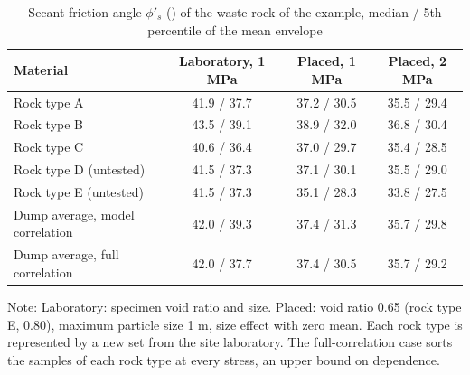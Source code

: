 \documentclass[Journal,letterpaper,InsideFigs,NoLists,NoLineNumbers]{ascelike-new}
\begin{document}
\begin{table}[htbp]
\caption{Secant friction angle $\phi'_s$ (\textdegree{}) of the waste rock of the example, median / 5th percentile of the mean envelope}
\centering\small
\renewcommand{\arraystretch}{1.2}
\setlength{\tabcolsep}{3.5pt}
\begin{tabular}{lccc}
\hline
Material & Laboratory, 1 MPa & Placed, 1 MPa & Placed, 2 MPa \\
\hline
Rock type A & 41.9 / 37.7 & 37.2 / 30.5 & 35.5 / 29.4 \\
Rock type B & 43.5 / 39.1 & 38.9 / 32.0 & 36.8 / 30.4 \\
Rock type C & 40.6 / 36.4 & 37.0 / 29.7 & 35.4 / 28.5 \\
Rock type D (untested) & 41.5 / 37.3 & 37.1 / 30.1 & 35.5 / 29.0 \\
Rock type E (untested) & 41.5 / 37.3 & 35.1 / 28.3 & 33.8 / 27.5 \\
Dump average, model correlation & 42.0 / 39.3 & 37.4 / 31.3 & 35.7 / 29.8 \\
Dump average, full correlation & 42.0 / 37.7 & 37.4 / 30.5 & 35.7 / 29.2 \\
\hline
\end{tabular}
\par\vspace{4pt}\parbox{\linewidth}{\footnotesize Note: Laboratory: specimen void ratio and size. Placed: void ratio 0.65 (rock type E, 0.80), maximum particle size 1 m, size effect with zero mean. Each rock type is represented by a new set from the site laboratory. The full-correlation case sorts the samples of each rock type at every stress, an upper bound on dependence.}
\end{table}
\end{document}
